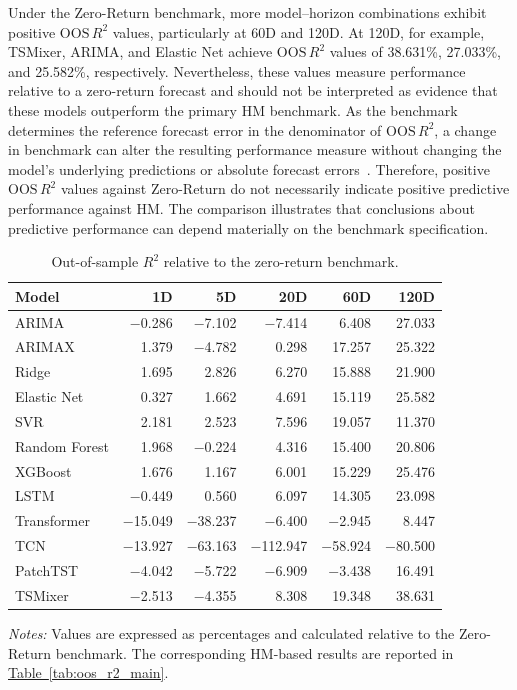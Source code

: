 \documentclass[runningheads,orivec]{llncs}
\begin{document}
Under the Zero-Return benchmark, more model--horizon combinations exhibit positive $\mathrm{OOS}\,R^2$ values, particularly at 60D and 120D. At 120D, for example, TSMixer, ARIMA, and Elastic Net achieve $\mathrm{OOS}\,R^2$ values of 38.631\%, 27.033\%, and 25.582\%, respectively. Nevertheless, these values measure performance relative to a zero-return forecast and should not be interpreted as evidence that these models outperform the primary HM benchmark. As the benchmark determines the reference forecast error in the denominator of $\mathrm{OOS}\,R^2$, a change in benchmark can alter the resulting performance measure without changing the model's underlying predictions or absolute forecast errors~\cite{campbell2008,gu2020,welch2008}. Therefore, positive $\mathrm{OOS}\,R^2$ values against Zero-Return do not necessarily indicate positive predictive performance against HM. The comparison illustrates that conclusions about predictive performance can depend materially on the benchmark specification.

\begin{table}[htbp]
\centering
\caption{Out-of-sample $R^2$ relative to the zero-return benchmark.}\label{tab:benchmark_comparison}
{\small
\setlength{\tabcolsep}{5pt}
\begin{tabular}{lrrrrr}
\hline
Model & 1D & 5D & 20D & 60D & 120D \\
\hline
ARIMA          & $-$0.286 & $-$7.102 &  $-$7.414 &   6.408 & 27.033 \\
ARIMAX         &  1.379 & $-$4.782 &   0.298 &  17.257 & 25.322 \\
Ridge          &  1.695 &  2.826 &   6.270 &  15.888 & 21.900 \\
Elastic Net    &  0.327 &  1.662 &   4.691 &  15.119 & 25.582 \\
SVR            &  2.181 &  2.523 &   7.596 &  19.057 & 11.370 \\
Random Forest  &  1.968 & $-$0.224 &   4.316 &  15.400 & 20.806 \\
XGBoost        &  1.676 &  1.167 &   6.001 &  15.229 & 25.476 \\
LSTM           & $-$0.449 &  0.560 &   6.097 &  14.305 & 23.098 \\
Transformer    & $-$15.049 & $-$38.237 &  $-$6.400 &  $-$2.945 &  8.447 \\
TCN            & $-$13.927 & $-$63.163 & $-$112.947 & $-$58.924 & $-$80.500 \\
PatchTST       & $-$4.042 & $-$5.722 &  $-$6.909 &  $-$3.438 & 16.491 \\
TSMixer        & $-$2.513 & $-$4.355 &   8.308 &  19.348 & 38.631 \\
\hline
\end{tabular}}
\par\vspace{4pt}\parbox{\linewidth}{\linespread{1.2}\selectfont\footnotesize\textit{Notes:} Values are expressed as percentages and calculated relative to the Zero-Return benchmark. The corresponding HM-based results are reported in \hyperref[tab:oos_r2_main]{Table~\ref*{tab:oos_r2_main}}.\par}
\end{table}
\end{document}
